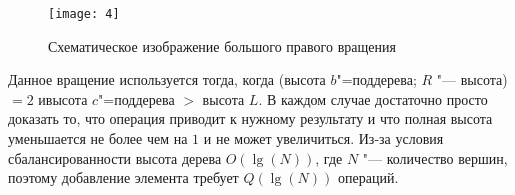 \begin{figure}[h]
    \texttt{[image: 4]}
    
    \caption{Схематическое изображение большого правого вращения}

\end{figure}

Данное вращение используется тогда, когда (высота $b$"=поддерева; $R$ "--- высота)
$= 2$ ивысота $c$"=поддерева $ > $ высота $L$.
В каждом случае достаточно просто доказать то, 
что операция приводит к нужному результату и
что полная высота уменьшается не более чем на $1$ и не может увеличиться.
Из-за условия сбалансированности высота дерева $O(\lg(N))$,
где $N$ "--- количество вершин, поэтому добавление элемента требует $Q(\lg(N))$ операций.
